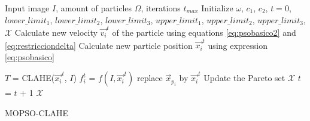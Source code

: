 \documentclass[spanish,twocolumn]{article}
\begin{document}
{\begin{algorithm}[H]
    \scriptsize
    \begin{algorithmic}[1]
        \Require Input image $I$, amount of particles $\Omega$, iterations $t_{max}$
        \State Initialize $\omega$, $c_1$, $c_2$, $t=0$, $lower\_limit_1$, $lower\_limit_2$, $lower\_limit_3$, $upper\_limit_1$, $upper\_limit_2$, $upper\_limit_3$, $\mathscr{X}$
                \State Calculate new velocity $\overrightarrow{v_i}^t$ of the particle  using equations \eqref{eq:psobasico2} and \eqref{eq:restricciondelta}
                \State Calculate new particle position $\overrightarrow{x_i}^t$ using expression \eqref{eq:psobasico}

                \State ${T}$ = CLAHE(${\overrightarrow{x_i}^t}$, ${I}$)
                \State ${f^t_i}$ = $f(I, \overrightarrow{x_i}^t)$%
                    \State replace $\overrightarrow{x}_{p_i}$ by $\overrightarrow{x_i}^t$
                \EndIf
                    \State Update the Pareto set $\mathscr{X}$
                \EndIf
                \State $t$ = $t$ + 1
            \EndFor
        \EndWhile
    \Ensure $\mathscr{X}$
    \end{algorithmic}
    \caption{MOPSO-CLAHE}
    \label{alg:pso_clahe}
\end{algorithm}

}
\end{document}
